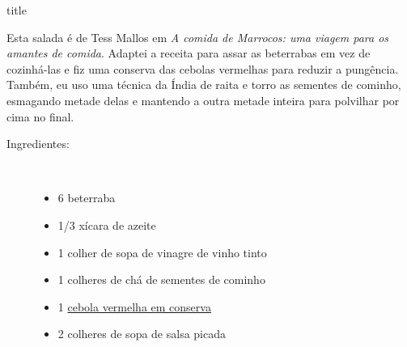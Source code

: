 \documentclass [11pt, papel de carta] {article}
\begin{document}
 {title}

Esta salada é de Tess Mallos em {\it A comida de Marrocos: uma viagem para os amantes de comida}. Adaptei a receita para assar as beterrabas em vez de cozinhá-las e fiz uma conserva das cebolas vermelhas para reduzir a pungência. Também, eu uso uma técnica da Índia de raita e torro as sementes de cominho, esmagando metade delas e mantendo a outra metade inteira para polvilhar por cima no final.

\begin {description}

\item [Ingredientes:] \ \\
\begin {itemize}
\item 6 beterraba
\item 1/3 xícara de azeite
\item 1 colher de sopa de vinagre de vinho tinto
\item 1 colheres de chá de sementes de cominho
\item 1 \href {PickledRedOnions.html} {cebola vermelha em conserva}
\item 2 colheres de sopa de salsa picada
\end {itemize}



\end{description}
\end{document}
